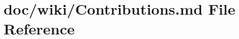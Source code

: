 \hypertarget{_contributions_8md}{}\section{doc/wiki/\+Contributions.md File Reference}
\label{_contributions_8md}
